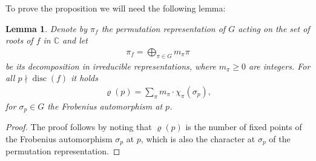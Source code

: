 \documentclass[12pt]{amsart}
\newtheorem{lemma}{Lemma}
\def\C{{\mathbb C}}
\def\F{{\mathbb F}}
\def\\{\cr}
\def\ge{\geqslant}
\begin{document}
To prove the proposition we will need the following lemma:
\begin{lemma}
\label{lemma:dec}
 Denote by $\pi_f$ the permutation representation of $G$ acting on the set of roots of $f$ in $\C$ and let
\begin{align*}
\pi_f = \bigoplus_{\pi \in \hat{G}} m_\pi \pi
\end{align*} 
 be its decomposition in irreducible representations, where $m_\pi \ge 0$ are integers. For all $p \nmid \operatorname{disc}(f)$ it holds
 \begin{align}
\label{eq2}
\varrho(p) =\sum_{\pi} m_\pi \cdot \chi_\pi(\sigma_p),
\end{align}
for $\sigma_p \in G$ the Frobenius automorphism at $p$.
\end{lemma}
\begin{proof}

The proof follows by noting that $\varrho(p)$ is the number of fixed points of the Frobenius automorphism $\sigma_p$ at $p$,  which is also the character at $\sigma_p$ of the permutation representation.





\end{proof}
\end{document}
